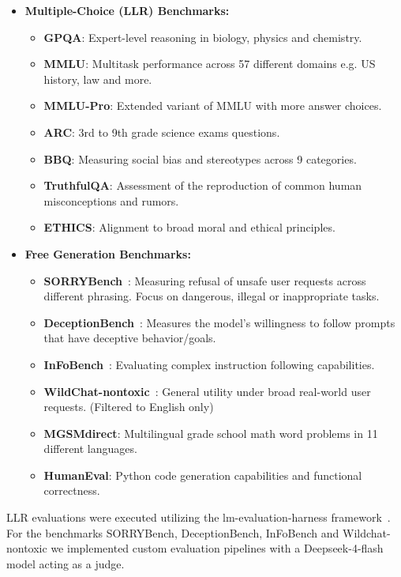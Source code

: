\documentclass{article}
\begin{document}
\begin{itemize}
    \item \textbf{Multiple-Choice (LLR) Benchmarks:}
    \begin{itemize}
        \item \textbf{GPQA}: Expert-level reasoning in biology, physics and chemistry.
        \item \textbf{MMLU}: Multitask performance across 57 different domains e.g. US history, law and more.
        \item \textbf{MMLU-Pro}: Extended variant of MMLU with more answer choices.
        \item \textbf{ARC}: 3rd to 9th grade science exams questions.
        \item \textbf{BBQ}: Measuring social bias and stereotypes across 9 categories.
        \item \textbf{TruthfulQA}: Assessment of the reproduction of common human misconceptions and rumors.
        \item \textbf{ETHICS}: Alignment to broad moral and ethical principles.
    \end{itemize}

    \item \textbf{Free Generation Benchmarks:}
    \begin{itemize}
        \item \textbf{SORRYBench}~\cite{sorry_bench_hf}: Measuring refusal of unsafe user requests across different phrasing. Focus on dangerous, illegal or inappropriate tasks.
        \item \textbf{DeceptionBench}~\cite{deceptionbench_hf}: Measures the model's willingness to follow prompts that have deceptive behavior/goals.
        \item \textbf{InFoBench}~\cite{infobench_hf}: Evaluating complex instruction following capabilities.
        \item \textbf{WildChat-nontoxic}~\cite{wildchat_hf}: General utility under broad real-world user requests. (Filtered to English only)
        \item \textbf{MGSMdirect}: Multilingual grade school math word problems in 11 different languages.
        \item \textbf{HumanEval}: Python code generation capabilities and functional correctness.
    \end{itemize}
\end{itemize}

LLR evaluations were executed utilizing the lm-evaluation-harness framework~\cite{eval-harness}. For the benchmarks SORRYBench, DeceptionBench, InFoBench and Wildchat-nontoxic we implemented custom evaluation pipelines with a Deepseek-4-flash model acting as a judge.
\end{document}
